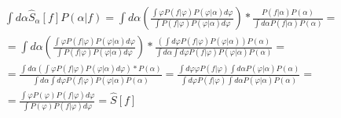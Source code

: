 \documentclass[8pt,pdf,hyperref={unicode}]{beamer}
\begin{document}
\begin{frame}
   \begin{equation*}
   \begin{split}
   \int d\alpha \hat{S}_{\alpha}[f] P(\alpha|f) = \int d\alpha \left(\frac{\int \varphi P(f|\varphi) P(\varphi|\alpha)d\varphi}{\int P(f|\varphi) P(\varphi|\alpha)d\varphi} \right) * \frac{P(f|\alpha)P(\alpha)}{\int d\alpha P(f|\alpha)P(\alpha)} = \\
   = \int d\alpha\left(\frac{\int \varphi P(f|\varphi) P(\varphi|\alpha)d\varphi}{\int P(f|\varphi) P(\varphi|\alpha)d\varphi} \right) * \frac{\left(\int d\varphi P(f|\varphi)P(\varphi|\alpha)\right)P(\alpha)}{\int d\alpha\int d\varphi P(f|\varphi)P(\varphi|\alpha)P(\alpha)} = \\ =
   \frac{\int d\alpha \left( \int \varphi P(f|\varphi) P(\varphi|\alpha)d\varphi \right)*P(\alpha)}{\int d\alpha\int d\varphi P(f|\varphi)P(\varphi|\alpha)P(\alpha)} =  \frac{\int d\varphi \varphi P(f|\varphi) \int d\alpha P(\varphi|\alpha)P(\alpha)}{\int d\varphi P(f|\varphi) \int d\alpha P(\varphi|\alpha)P(\alpha)} = \\=
   \frac{\int \varphi P(\varphi)P(f|\varphi) d\varphi }{\int P(\varphi)P(f|\varphi)d\varphi} = \hat{S}[f]
   \end{split} 
   \end{equation*}
\end{frame}
\end{document}
